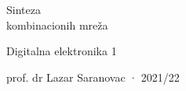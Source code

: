 \begin{frame}[label=02-s001]
\centering
\vfill
{\fontsize{28}{33}\selectfont\color{DEplava}Sinteza\\[4mm]kombinacionih mreža}\par
\par\vspace{8mm}
{\large Digitalna elektronika 1}\par
\par\vspace{2mm}
{\normalsize prof. dr Lazar Saranovac · 2021/22}
\vfill
\end{frame}
